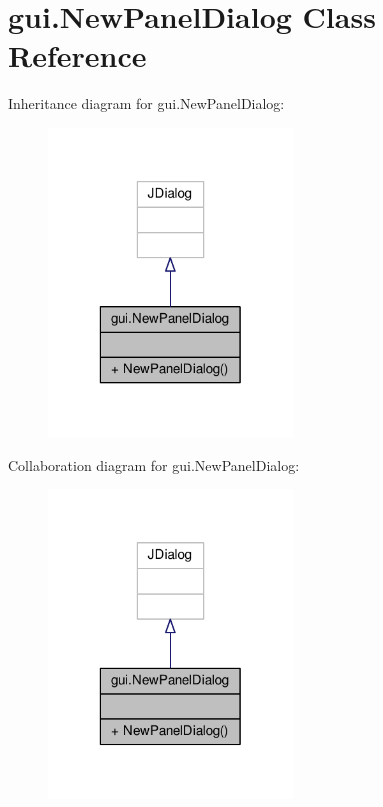 \hypertarget{classgui_1_1NewPanelDialog}{\section{gui.\-New\-Panel\-Dialog Class Reference}
\label{classgui_1_1NewPanelDialog}
}


Inheritance diagram for gui.\-New\-Panel\-Dialog\-:\nopagebreak
\begin{figure}[H]
\begin{center}
\leavevmode
\includegraphics[width=184pt]{classgui_1_1NewPanelDialog__inherit__graph}
\end{center}
\end{figure}


Collaboration diagram for gui.\-New\-Panel\-Dialog\-:\nopagebreak
\begin{figure}[H]
\begin{center}
\leavevmode
\includegraphics[width=184pt]{classgui_1_1NewPanelDialog__coll__graph}
\end{center}
\end{figure}
